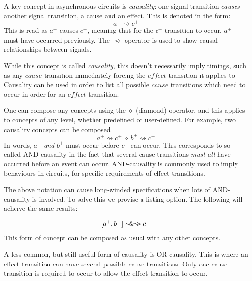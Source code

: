 \documentclass[british,conference,compsoc]{IEEEtran}
\begin{document}
A key concept in asynchronous circuits is \emph{causality}:
one signal transition \emph{causes} another signal transition, a cause and an effect.
This is denoted in the form: 
\[
a^{+}\rightsquigarrow c^{+}
\]
This is read as $a^{+}$ causes $c^{+}$, meaning that for the $c^{+}$ transition to
occur, $a^{+}$ must have occurred previously. The $\rightsquigarrow$ operator is
used to show causal relationships between signals.
 
While this concept is called \emph{causality}, this doesn't necessarily imply
timings, such as any $\mathit{cause}$ transition immediately forcing the
 $\mathit{effect}$ transition it applies to. Causality can be used in order to
list all possible $\mathit{cause}$ transitions which need to occur in order
 for an $\mathit{effect}$ transition.

One can compose any concepts using the $\diamond$ (diamond) operator, and this applies
to concepts of any level, whether predefined or user-defined. For example, 
two causality concepts can be composed.
\[
a^{+}\rightsquigarrow c^{+}\ \diamond\ b^{+}\rightsquigarrow c^{+}
\]
In words, $a^{+}$ \emph{and} $b^{+}$ must occur before $c^{+}$ can occur. 
This corresponds to so-called AND-causality in the fact that several cause transitions \emph{must all}
have occurred before an event can occur. AND-causality is commonly used
to imply behaviours in circuits, for specific requirements of effect transitions.  

The above notation can cause long-winded specifications when lots of AND-causality is involved. 
To solve this we provise a listing option. The following will acheive the same results:


\[
[a^{+}, b^{+}]\sim\hspace{-1.5mm}\&\hspace{-1.5mm}\sim\hspace{-1.5mm}>c^{+}
\]
This form of concept can be composed as usual with any other concepts.

A less common, but still useful form of causality is OR-causality. This is where an effect transition
can have several possible cause transitions. Only one cause transition is required to occur to allow
the effect transition to occur. 

\end{document}
